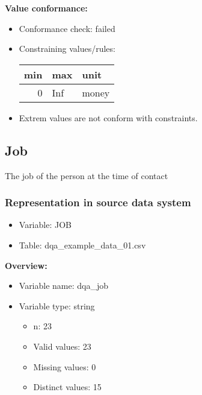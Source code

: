 \documentclass[
]{article}
\providecommand{\tightlist}{%
  \setlength{\itemsep}{0pt}\setlength{\parskip}{0pt}}
\begin{document}
\textbf{Value conformance:}

\begin{itemize}
\tightlist
\item
  Conformance check: failed
\item
  Constraining values/rules:

  \begin{table}[H]
  \centering
  \begin{tabular}{r|l|l}
  \hline
  \textbf{min} & \textbf{max} & \textbf{unit}\\
  \hline
  0 & Inf & money\\
  \hline
  \end{tabular}
  \end{table}
\item
  Extrem values are not conform with constraints.
\end{itemize}

\newpage

\hypertarget{job}{%
\subsection{Job}\label{job}}

The job of the person at the time of contact

\hypertarget{representation-in-source-data-system-8}{%
\subsubsection{\texorpdfstring{Representation in \textbf{source} data
system}{Representation in source data system}}\label{representation-in-source-data-system-8}}

\begin{itemize}
\tightlist
\item
  Variable: JOB
\item
  Table: dqa\_example\_data\_01.csv
\end{itemize}

\textbf{Overview:}

\begin{itemize}
\tightlist
\item
  Variable name: dqa\_job
\item
  Variable type: string

  \begin{itemize}
  \tightlist
  \item
    n: 23
  \item
    Valid values: 23
  \item
    Missing values: 0
  \item
    Distinct values: 15
  \end{itemize}
\end{itemize}
\end{document}
